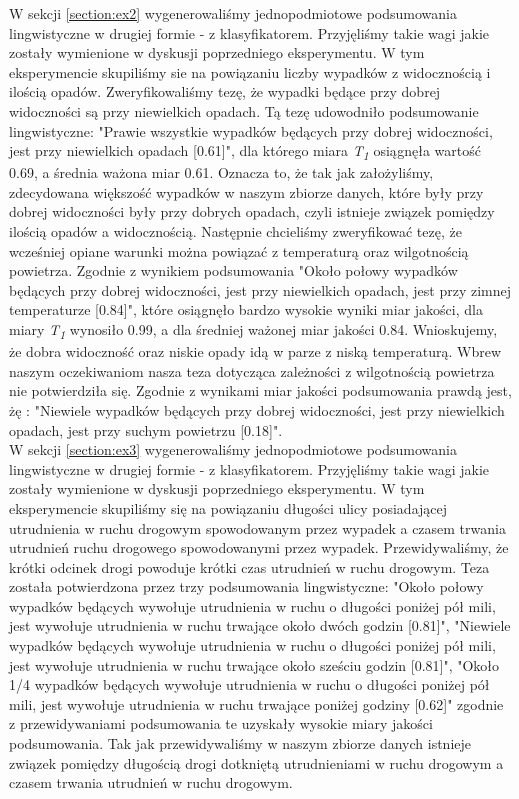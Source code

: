 \documentclass{classrep}
\begin{document}
W sekcji \ref{section:ex2} wygenerowaliśmy jednopodmiotowe podsumowania lingwistyczne w drugiej formie - z klasyfikatorem. Przyjęliśmy takie wagi jakie zostały wymienione w dyskusji poprzedniego eksperymentu. W tym eksperymencie skupiliśmy sie na powiązaniu liczby wypadków z widocznością i ilością opadów. Zweryfikowaliśmy tezę, że wypadki będące przy dobrej widoczności są przy niewielkich opadach. Tą tezę udowodniło podsumowanie lingwistyczne: "Prawie wszystkie wypadków będących przy dobrej widoczności, jest przy niewielkich opadach [0.61]", dla którego miara \textit{T\textsubscript{1}} osiągnęła wartość 0.69, a średnia ważona miar 0.61. Oznacza to, że tak jak założyliśmy, zdecydowana większość wypadków w naszym zbiorze danych, które były przy dobrej widoczności były przy dobrych opadach, czyli istnieje związek pomiędzy ilością opadów a widocznością. Następnie chcieliśmy zweryfikować tezę, że wcześniej opiane warunki można powiązać z temperaturą oraz wilgotnością powietrza. Zgodnie z wynikiem podsumowania "Około połowy wypadków będących przy dobrej widoczności, jest przy niewielkich opadach, jest przy zimnej temperaturze [0.84]", które osiągnęło bardzo wysokie wyniki miar jakości, dla miary \textit{T\textsubscript{1}} wynosiło 0.99, a dla średniej ważonej miar jakości 0.84. Wnioskujemy, że dobra widoczność oraz niskie opady idą w parze z niską temperaturą. Wbrew naszym oczekiwaniom nasza teza dotycząca zależności z wilgotnością powietrza nie potwierdziła się. Zgodnie z wynikami miar jakości podsumowania prawdą jest, żę : "Niewiele wypadków będących przy dobrej widoczności, jest przy niewielkich opadach, jest przy suchym powietrzu [0.18]". \\

W sekcji \ref{section:ex3} wygenerowaliśmy jednopodmiotowe podsumowania lingwistyczne w drugiej formie - z klasyfikatorem. Przyjęliśmy takie wagi jakie zostały wymienione w dyskusji poprzedniego eksperymentu. W tym eksperymencie skupiliśmy się na powiązaniu długości ulicy posiadającej utrudnienia w ruchu drogowym spowodowanym przez wypadek a czasem trwania utrudnień ruchu drogowego spowodowanymi przez wypadek. Przewidywaliśmy, że krótki odcinek drogi powoduje krótki czas utrudnień w ruchu drogowym. Teza została potwierdzona przez trzy podsumowania lingwistyczne: "Około połowy wypadków będących wywołuje utrudnienia w ruchu o długości poniżej pół mili, jest wywołuje utrudnienia w ruchu trwające około dwóch godzin [0.81]", "Niewiele wypadków będących wywołuje utrudnienia w ruchu o długości poniżej pół mili, jest wywołuje utrudnienia w ruchu trwające około sześciu godzin [0.81]", "Około 1/4 wypadków będących wywołuje utrudnienia w ruchu o długości poniżej pół mili, jest wywołuje utrudnienia w ruchu trwające poniżej godziny [0.62]" zgodnie z przewidywaniami podsumowania te uzyskały wysokie miary jakości podsumowania. Tak jak przewidywaliśmy w naszym zbiorze danych istnieje związek pomiędzy długością drogi dotkniętą utrudnieniami w ruchu drogowym a czasem trwania utrudnień w ruchu drogowym.
\end{document}
